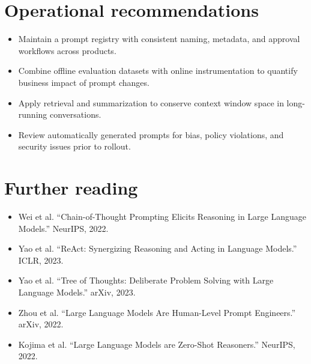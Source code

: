 \documentclass{article}
\begin{document}
\section*{Operational recommendations}
\begin{itemize}
  \item Maintain a prompt registry with consistent naming, metadata, and approval workflows across products.
  \item Combine offline evaluation datasets with online instrumentation to quantify business impact of prompt changes.
  \item Apply retrieval and summarization to conserve context window space in long-running conversations.
  \item Review automatically generated prompts for bias, policy violations, and security issues prior to rollout.
\end{itemize}

\section*{Further reading}
\begin{itemize}
  \item Wei et al. ``Chain-of-Thought Prompting Elicits Reasoning in Large Language Models.'' NeurIPS, 2022.
  \item Yao et al. ``ReAct: Synergizing Reasoning and Acting in Language Models.'' ICLR, 2023.
  \item Yao et al. ``Tree of Thoughts: Deliberate Problem Solving with Large Language Models.'' arXiv, 2023.
  \item Zhou et al. ``Large Language Models Are Human-Level Prompt Engineers.'' arXiv, 2022.
  \item Kojima et al. ``Large Language Models are Zero-Shot Reasoners.'' NeurIPS, 2022.
\end{itemize}
\end{document}
